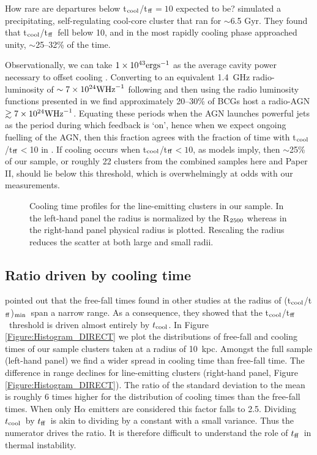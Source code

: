 \documentclass[twocolumn]{aastex6}
\newcommand{\tctff}{{t$_{\rm cool}$/t$_{\rm ff}$}}
\newcommand{\tctffmin}{(\tctff)$_{\rm min}$}
\newcommand{\tc}{$t_{\rm cool}$}
\newcommand{\tff}{$t_{\rm ff}$}
\begin{document}
How rare are departures below \tctff$= 10$ expected to be?  \citet[][]{Li15} simulated a precipitating, self-regulating cool-core cluster that ran for $\sim$6.5 Gyr.  They found that \tctff\ fell below 10, and in the most rapidly cooling phase approached unity, $\sim$25--32\% of the time.  

Observationally, we can take $1 \times 10^{43} {\rm erg s}^{-1}$ as the average cavity power necessary to offset cooling \cite[][]{Rafferty06}.  Converting to an equivalent 1.4~GHz radio-luminosity of $\sim 7 \times 10^{24} {\rm W Hz}^{-1}$ following \citet[][]{Birzan04} and then using the radio luminosity functions presented in \citet[][]{Hogan15a} we find approximately 20--30\% of BCGs host a radio-AGN $\gtrsim 7 \times 10^{24} {\rm W Hz}^{-1}$.  Equating these periods when the AGN launches powerful jets as the period during which feedback is `on', hence when we expect ongoing fuelling of the AGN, then this fraction agrees with the fraction of time with \tctff$<$10 in \citet[][]{Li15}.  If cooling occurs when \tctff$< 10$, as models imply, then  $\sim$25\% of our sample, or roughly 22 clusters from the combined samples here and Paper II, should lie below this threshold, which is overwhelmingly at odds with our measurements. 


\begin{figure*}    
  \centering
  \caption{Cooling time profiles for the line-emitting clusters in our sample.  In the left-hand panel the radius is normalized by the R$_{\rm 2500}$ whereas in the right-hand panel physical radius is plotted.  Rescaling the radius reduces the scatter at both large and small radii.}
 \label{Figure:ScaledCoolingTimeProfiles}
\end{figure*}



\subsection{Ratio driven by cooling time} \label{Section:FFvsC}

\citet[][]{McNamara16} pointed out that the free-fall times found in other studies at the radius of \tctffmin\ span a narrow range.  As a consequence, they showed that the \tctff\ threshold is driven almost entirely by \tc. In Figure \ref{Figure:Histogram_DIRECT} we plot the distributions of free-fall and cooling times of our sample clusters taken at a radius of 10~kpc. Amongst the full sample (left-hand panel) we find a wider spread in cooling time than free-fall time.  The difference in range declines for line-emitting clusters (right-hand panel, Figure \ref{Figure:Histogram_DIRECT}).  The ratio of the standard deviation to the mean is roughly 6 times higher for the distribution of cooling times than the free-fall times.  When only H$\alpha$ emitters are considered this factor falls to 2.5.  Dividing \tc\ by \tff\ is akin to dividing by a constant with a small variance.  Thus the numerator drives the ratio.  It is therefore difficult to understand the role of \tff\ in thermal instability.
\end{document}
